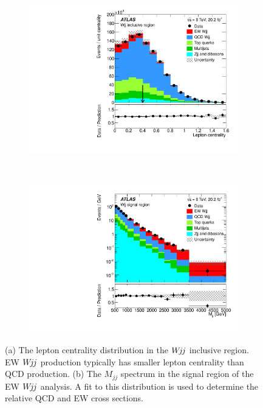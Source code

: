 \documentclass{PoS}
\def\wjj{\ensuremath{W\kern -0.2em j\kern -0.1emj}\xspace}
\def\mjj{\ensuremath{M_{jj}}\xspace}
\begin{document}
\begin{figure}
  \centering
  \begin{subfigure}[t]{0.50\textwidth}
    \centering
    \includegraphics[width=.99\textwidth]{STDM-2014-11/fig_05b.pdf}\vspace{-6mm}
    \caption{}
  \end{subfigure}%
  ~
  \begin{subfigure}[t]{0.50\textwidth}
    \centering
    \includegraphics[width=.99\textwidth]{STDM-2014-11/fig_09b.pdf}\vspace{-6mm}
    \caption{}
  \end{subfigure}%
  \caption{(a) The lepton centrality distribution in the \wjj inclusive region. EW \wjj production
typically has smaller lepton centrality than QCD production. (b) The \mjj spectrum in the signal region
of the EW \wjj analysis. A fit to this distribution is used to determine the relative QCD and EW cross
sections.
}
  \label{wjj-cartoons}
\end{figure}
\end{document}
